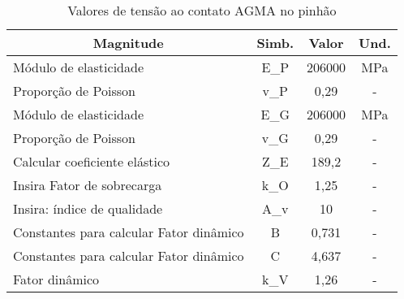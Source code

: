 \begin{table}[]
\centering
\caption{\label{tab:4} Valores de tensão ao contato AGMA no pinhão}
\hline
\begin{tabular}{l c c c}
\multicolumn{1}{c}{\textbf{Magnitude}}                                                                                       & \textbf{Simb.} & \textbf{Valor} & \textbf{Und.} \\ \hline
Módulo de elasticidade                                                                                                       & E_P             & 206000         & MPa           \\
Proporção de Poisson                                                                                                         & v_P             & 0,29           & -             \\
Módulo de elasticidade                                                                                                       & E_G             & 206000         & MPa           \\
Proporção de Poisson                                                                                                         & v_G             & 0,29           & -             \\
Calcular coeficiente elástico                                                                                                & Z_E             & 189,2          & -             \\
Insira Fator de sobrecarga                                                                                                   & k_O             & 1,25           & -             \\
Insira: índice de qualidade                                                                                                  & A_v             & 10             & -             \\
Constantes para calcular Fator dinâmico                                                                                      & B              & 0,731          & -             \\
Constantes para calcular Fator dinâmico                                                                                      & C              & 4,637          & -             \\
Fator dinâmico                                                                                                               & k_V             & 1,26           & -             \\

\end{tabular}
\end{table}

